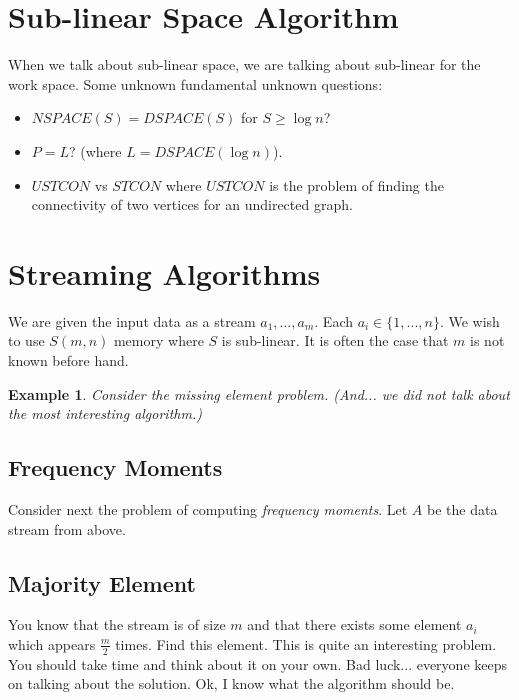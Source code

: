 \documentclass[twoside]{article}
\newtheorem{example}[theorem]{Example}
\begin{document}
\section{Sub-linear Space Algorithm}
When we talk about sub-linear space, we are talking about sub-linear for the work space. Some unknown fundamental unknown questions:
\begin{itemize}
\item $NSPACE(S) = DSPACE(S)$ for $S \geq \log n$?
\item $P = L$? (where $L = DSPACE(\log n)$).
\item $USTCON$ vs $STCON$ where $USTCON$ is the problem of finding the connectivity of two vertices for an undirected graph. 
\end{itemize} 

\section{Streaming Algorithms}
We are given the input data as a stream $a_1, ..., a_m$. Each $a_i \in \{1, ..., n\}$. We wish to use $S(m,n)$ memory where $S$ is sub-linear. It is often the case that $m$ is not known before hand. 

\begin{example}
Consider the missing element problem. (And... we did not talk about the most interesting algorithm.)
\end{example}

\subsection{Frequency Moments}
Consider next the problem of computing \emph{frequency moments}. Let $A$ be the data stream from above. 

\subsection{Majority Element}
You know that the stream is of size $m$ and that there exists some element $a_i$ which appears $\frac{m}{2}$ times. Find this element. This is quite an interesting problem. You should take time and think about it on your own. Bad luck... everyone keeps on talking about the solution. Ok, I know what the algorithm should be.  
\end{document}
